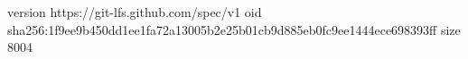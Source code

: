 version https://git-lfs.github.com/spec/v1
oid sha256:1f9ee9b450dd1ee1fa72a13005b2e25b01cb9d885eb0fc9ee1444ece698393ff
size 8004
